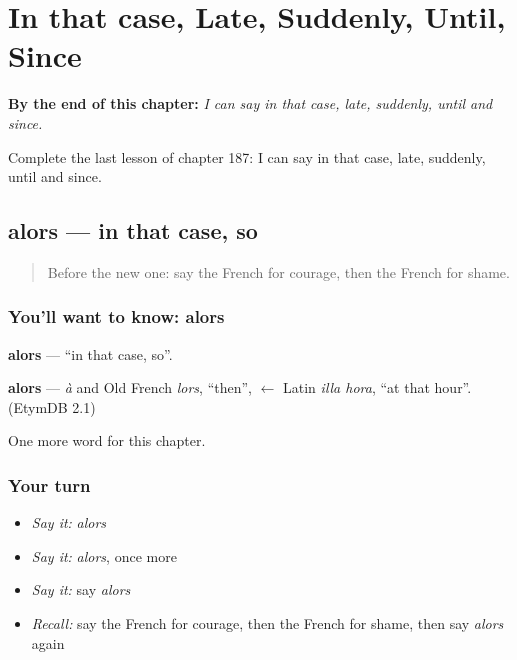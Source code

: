 
\chapter{In that case, Late, Suddenly, Until, Since}
\label{ch:fr-in-that-case-late-suddenly-until-since}

\begin{chapteropening}
\textbf{By the end of this chapter:} \emph{I can say in that case, late, suddenly, until and since.}

Complete the last lesson of chapter 187: I can say in that case, late, suddenly, until and since.
\end{chapteropening}

\section[alors]{alors — in that case, so}

\label{lesson:FR-C187-alors}



\begin{quote}
Before the new one: say the French for courage, then the French for shame.
\end{quote}

\subsection*{You'll want to know: alors}
\textbf{alors} — \textquotedblleft{}in that case, so\textquotedblright{}.

\begin{cousinweb}
\textbf{alors} — \emph{à} and Old French \emph{lors}, \textquotedblleft{}then\textquotedblright{}, $\leftarrow$ Latin \emph{illa hora}, \textquotedblleft{}at that hour\textquotedblright{}. (EtymDB 2.1)
\end{cousinweb}

\begin{grammarlens}[title={What you've built}]
One more word for this chapter.
\end{grammarlens}

\subsection*{Your turn}
\begin{itemize}
\raggedright
  \item \emph{Say it:} \emph{alors}
  \item \emph{Say it:} \emph{alors}, once more
  \item \emph{Say it:} say \emph{alors}
  \item \emph{Recall:} say the French for courage, then the French for shame, then say \emph{alors} again
\end{itemize}

